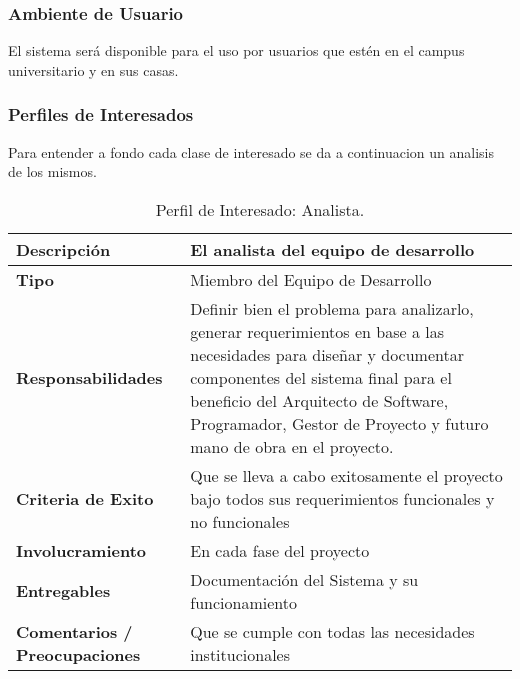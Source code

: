\subsubsection{Ambiente de Usuario}
El sistema será disponible para el uso por usuarios que estén en el campus universitario y en sus casas.

\subsubsection{Perfiles de Interesados}
Para entender a fondo cada clase de interesado se da a continuacion un analisis de los mismos.

\begin{table}[h!]
  \begin{tabular}{|p{}|p{}|}
    \hline
    \textbf{Descripción} & El analista del equipo de desarrollo \\
    \hline
    \textbf{Tipo} & Miembro del Equipo de Desarrollo \\
    \hline
    \textbf{Responsabilidades} & Definir bien el problema para analizarlo, generar requerimientos en base a las necesidades para diseñar y documentar componentes del sistema final para el beneficio del Arquitecto de Software, Programador, Gestor de Proyecto y futuro mano de obra en el proyecto. \\
    \hline
    \textbf{Criteria de Exito} & Que se lleva a cabo exitosamente el proyecto bajo todos sus requerimientos funcionales y no funcionales \\
    \hline
    \textbf{Involucramiento} & En cada fase del proyecto \\
    \hline
    \textbf{Entregables} & Documentación del Sistema y su funcionamiento \\
    \hline
    \textbf{Comentarios / Preocupaciones} & Que se cumple con todas las necesidades institucionales \\
    \hline
  \end{tabular}
  \caption{Perfil de Interesado: Analista.}
  \label{per-inter-analista}
\end{table}

